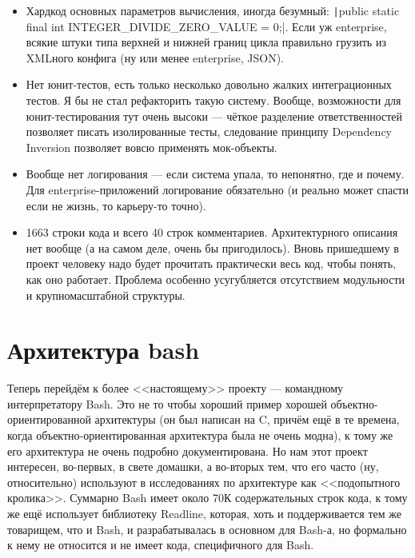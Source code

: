 \documentclass{../../text-style}
\begin{document}
\begin{itemize}
    \item Хардкод основных параметров вычисления, иногда безумный: \texttt|public static final int INTEGER_DIVIDE_ZERO_VALUE = 0;|. Если уж enterprise, всякие штуки типа верхней и нижней границ цикла правильно грузить из XMLного конфига (ну или менее enterprise, JSON).
    \item Нет юнит-тестов, есть только несколько довольно жалких интеграционных тестов. Я бы не стал рефакторить такую систему. Вообще, возможности для юнит-тестирования тут очень высоки --- чёткое разделение ответственностей позволяет писать изолированные тесты, следование принципу Dependency Inversion позволяет вовсю применять мок-объекты.
    \item Вообще нет логирования --- если система упала, то непонятно, где и почему. Для enterprise-приложений логирование обязательно (и реально может спасти если не жизнь, то карьеру-то точно).
    \item 1663 строки кода и всего 40 строк комментариев. Архитектурного описания нет вообще (а на самом деле, очень бы пригодилось). Вновь пришедшему в проект человеку надо будет прочитать практически весь код, чтобы понять, как оно работает. Проблема особенно усугубляется отсутствием модульности и крупномасштабной структуры.
\end{itemize}

\section{Архитектура bash}

Теперь перейдём к более <<настоящему>> проекту --- командному интерпретатору Bash. Это не то чтобы хороший пример хорошей объектно-ориентированной архитектуры (он был написан на C, причём ещё в те времена, когда объектно-ориентированная архитектура была не очень модна), к тому же его архитектура не очень подробно документирована. Но нам этот проект интересен, во-первых, в свете домашки, а во-вторых тем, что его часто (ну, относительно) используют в исследованиях по архитектуре как <<подопытного кролика>>. Суммарно Bash имеет около 70К содержательных строк кода, к тому же ещё использует библиотеку Readline, которая, хоть и поддерживается тем же товарищем, что и Bash, и разрабатывалась в основном для Bash-а, но формально к нему не относится и не имеет кода, специфичного для Bash.
\end{document}
